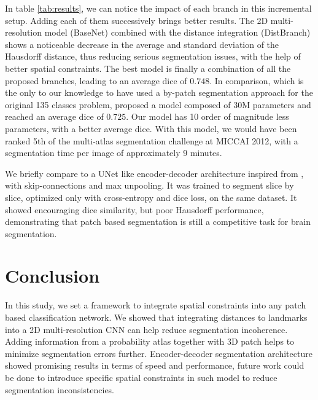 \documentclass{article}
\begin{document}
In table \ref{tab:results}, we can notice the impact of each branch in this incremental setup. Adding each of them successively brings better results. 
The 2D multi-resolution model (BaseNet) combined with the distance integration (DistBranch) shows a noticeable decrease in the average and standard deviation of the Hausdorff distance, thus reducing serious segmentation issues, with the help of better spatial constraints. The best model is finally a combination of all the proposed branches, leading to an average dice of $0.748$. In comparison, \cite{brebisson} which is the only to our knowledge to have used a by-patch segmentation approach for the original 135 classes problem, proposed a model composed of 30M parameters and reached an average dice of $0.725$. Our model has 10 order of magnitude less parameters, with a better average dice. With this model, we would have been ranked 5th of the multi-atlas segmentation challenge at MICCAI 2012, with a segmentation time per image of approximately 9 minutes. 

We briefly compare to a UNet \cite{unet} like encoder-decoder architecture inspired from \cite{DBLP:journals/corr/RoyCSKNW17}, with skip-connections and max unpooling. It was trained to segment slice by slice, optimized only with cross-entropy and dice loss, on the same dataset. It showed encouraging dice similarity, but poor Hausdorff performance, demonstrating that patch based segmentation is still a competitive task for brain segmentation.

\section{Conclusion}
In this study, we set a framework to integrate spatial constraints into any patch based classification network. We showed that integrating distances to landmarks into a 2D multi-resolution CNN can help reduce segmentation incoherence. Adding information from a probability atlas together with 3D patch helps to minimize segmentation errors further. \newline
Encoder-decoder segmentation architecture showed promising results in terms of speed and performance, future work could be done to introduce specific spatial constraints in such model to reduce segmentation inconsistencies.
\end{document}
